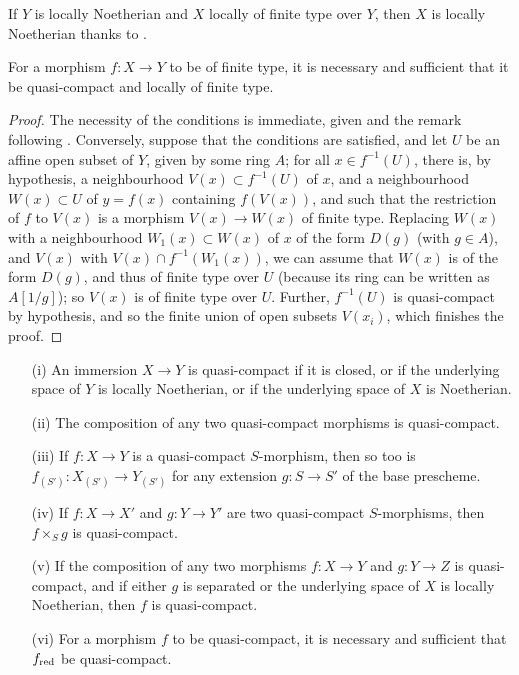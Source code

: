 If $Y$ is locally Noetherian and $X$ locally of finite type over $Y$, then $X$ is locally Noetherian thanks to .

\begin{proposition}[6.6.3]
\label{I.6.6.3}
For a morphism $f: X\to Y$ to be of finite type, it is necessary and sufficient that it be quasi-compact and locally of finite type.
\end{proposition}

\begin{proof}
The necessity of the conditions is immediate, given  and the remark following .
Conversely, suppose that the conditions are satisfied, and let $U$ be an affine open subset of $Y$, given by some ring $A$;
for all $x\in f^{-1}(U)$, there is, by hypothesis, a neighbourhood $V(x)\subset f^{-1}(U)$ of $x$, and a neighbourhood $W(x)\subset U$ of $y=f(x)$ containing $f(V(x))$, and such that the restriction of $f$ to $V(x)$ is a morphism $V(x)\to W(x)$ of finite type.
Replacing $W(x)$ with a neighbourhood $W_1(x)\subset W(x)$ of $x$ of the form $D(g)$ (with $g\in A$), and $V(x)$ with $V(x)\cap f^{-1}(W_1(x))$, we can assume that $W(x)$ is of the form $D(g)$, and thus of finite type over $U$ (because its ring can be written as $A[1/g]$);
so $V(x)$ is of finite type over $U$.
Further, $f^{-1}(U)$ is quasi-compact by hypothesis, and so the finite union of open subsets $V(x_i)$, which finishes the proof.
\end{proof}

\begin{proposition}[6.6.4]
\label{I.6.6.4}
\medskip\noindent
\begin{enumerate}
  \item[{\rm(i)}] An immersion $X\to Y$ is quasi-compact if it is closed, or if the underlying space of $Y$ is locally Noetherian, or if the underlying space of $X$ is Noetherian.
  \item[{\rm(ii)}] The composition of any two quasi-compact morphisms is quasi-compact.
  \item[{\rm(iii)}] If $f: X\to Y$ is a quasi-compact $S$-morphism, then so too is $f_{(S')}: X_{(S')}\to Y_{(S')}$ for any extension $g: S\to S'$ of the base prescheme.
  \item[{\rm(iv)}] If $f:X\to X'$ and $g:Y\to Y'$ are two quasi-compact $S$-morphisms, then $f\times_S g$ is quasi-compact.
  \item[{\rm(v)}] If the composition of any two morphisms $f: X\to Y$ and $g:Y\to Z$ is quasi-compact, and if either $g$ is separated or the underlying space of $X$ is locally Noetherian, then $f$ is quasi-compact.
  \item[{\rm(vi)}] For a morphism $f$ to be quasi-compact, it is necessary and sufficient that $f_{\mathrm{red}}$ be quasi-compact.
\end{enumerate}
\end{proposition}

